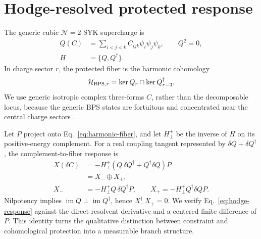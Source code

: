 \section{Hodge-resolved protected response}
\label{sec:response-complex}

The generic cubic \(\mathcal N=2\) SYK supercharge is
\begin{equation}
 \begin{split}
 Q(C)&=\sum_{i<j<k}C_{ijk}\psi_i\psi_j\psi_k,\qquad Q^2=0,\\
 H&=\{Q,Q^\dagger\}.
 \end{split}
 \label{eq:supercharge}
\end{equation}
In charge sector \(r\), the protected fiber is the harmonic cohomology
\begin{equation}
 \mathcal H_{\mathrm{BPS},r}=\ker Q_r\cap\ker Q_{r-3}^\dagger.
 \label{eq:harmonic-fiber}
\end{equation}
We use generic isotropic complex three-forms \(C\), rather than the decomposable locus, because the generic BPS states are fortuitous and concentrated near the central charge sectors \cite{fu2017susy,chang2024fortuity}.

Let \(P\) project onto Eq.~\eqref{eq:harmonic-fiber}, and let \(H_\perp^+\) be the inverse of \(H\) on its positive-energy complement. For a real coupling tangent represented by \(\delta Q+\delta Q^\dagger\), the complement-to-fiber response is
\begin{align}
 X(\delta C)&=-H_\perp^+\left(Q\,\delta Q^\dagger+Q^\dagger\delta Q\right)P
 \nonumber\\
 &=X_-\oplus X_+,
 \label{eq:hodge-response}\\
 X_-&=-H_\perp^+Q\,\delta Q^\dagger P,
 \qquad
 X_+=-H_\perp^+Q^\dagger\delta QP.
 \nonumber
\end{align}
Nilpotency implies \(\operatorname{im}Q\perp\operatorname{im}Q^\dagger\), hence \(X_-^\dagger X_+=0\). We verify Eq.~\eqref{eq:hodge-response} against the direct resolvent derivative and a centered finite difference of \(P\). This identity turns the qualitative distinction between constraint and cohomological protection into a measurable branch structure.

